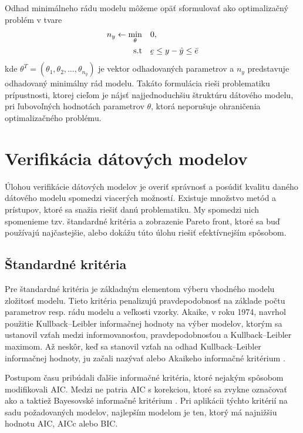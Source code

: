 Odhad minimálneho rádu modelu môžeme opäť sformulovať ako optimalizačný problém v tvare
\begin{equation}
	\begin{split}
		n_y \leftarrow \min_{\theta} & \quad 0, \\
		\text{s.t} & \quad \ubar{e} \leq y - \hat{y} \leq \bar{e}
	\end{split}
	\label{eq:GPE_m_order_est}
\end{equation}
kde $ \theta^T = (\theta_1, \theta_2, \dots, \theta_{n_y}) $ je vektor odhadovaných parametrov a $ n_y $ predstavuje odhadovaný minimálny rád modelu. Takáto formulácia rieši problematiku prípustnosti, ktorej cieľom je nájsť najjednoduchšiu štruktúru dátového modelu, pri ľubovoľných hodnotách parametrov $ \theta $, ktorá neporušuje ohraničenia optimalizačného problému.  

\section{Verifikácia dátových modelov}
Úlohou verifikácie dátových modelov je overiť správnosť a posúdiť kvalitu daného dátového modelu spomedzi viacerých možností. Existuje množstvo metód a prístupov, ktoré sa snažia riešiť danú problematiku.
My spomedzi nich spomenieme tzv. štandardné kritéria a zobrazenie Pareto front, ktoré sa buď používajú najčastejšie, alebo dokážu túto úlohu riešiť efektívnejším spôsobom.

\subsection{Štandardné kritéria}
Pre štandardné kritéria je základným elementom výberu vhodného modelu zložitosť modelu. Tieto kritéria penalizujú pravdepodobnosť na základe počtu parametrov resp. rádu modelu a veľkosti vzorky. Akaike, v roku 1974, navrhol použitie Kullback–Leibler informačnej hodnoty na výber modelov, ktorým sa ustanovil vzťah medzi informovanosťou, pravdepodobnosťou a Kullback–Leibler maximom. Až neskôr, keď sa stanovil vzťah na odhad  Kullback–Leibler informačnej hodnoty, ju začali nazývať  alebo Akaikeho informačné kritérium  \cite{emiliano:stand_crit:2014}. 

Postupom času pribúdali ďalšie informačné kritéria, ktoré nejakým spôsobom modifikovali AIC. Medzi ne patria AIC s korekciou, ktoré sa zvykne označovať ako  a taktiež Bayesovské informačné kritérium . Pri aplikácii týchto kritérií na sadu požadovaných modelov, najlepším modelom je ten, ktorý má najnižšiu hodnotu AIC, AICc alebo BIC.

